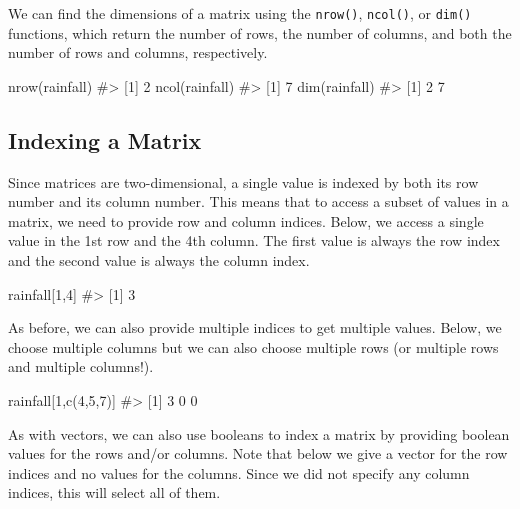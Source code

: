 \documentclass[
  letterpaper,
]{krantz}
\makeatletter
\newenvironment{Shaded}{\begin{snugshade}}{\end{snugshade}}
\newcommand{\CommentTok}[1]{\textcolor[rgb]{0.37,0.37,0.37}{#1}}
\newcommand{\DecValTok}[1]{\textcolor[rgb]{0.68,0.00,0.00}{#1}}
\newcommand{\FunctionTok}[1]{\textcolor[rgb]{0.28,0.35,0.67}{#1}}
\newcommand{\NormalTok}[1]{\textcolor[rgb]{0.00,0.23,0.31}{#1}}
\newenvironment{kframe}{%
\medskip{}
\setlength{\fboxsep}{.8em}
 \def\at@end@of@kframe{}%
 \ifinner\ifhmode%
  \def\at@end@of@kframe{\end{minipage}}%
  \begin{minipage}{\columnwidth}%
 \fi\fi%
 \def\FrameCommand##1{\hskip\@totalleftmargin \hskip-\fboxsep
 \colorbox{shadecolor}{##1}\hskip-\fboxsep
     \hskip-\linewidth \hskip-\@totalleftmargin \hskip\columnwidth}%
 \MakeFramed {\advance\hsize-\width
   \@totalleftmargin\z@ \linewidth\hsize
   \@setminipage}}%
 {\par\unskip\endMakeFramed%
 \at@end@of@kframe}
\renewenvironment{Shaded}{\begin{kframe}}{\end{kframe}}
\makeatother
\begin{document}
We can find the dimensions of a matrix using the \texttt{nrow()},
\texttt{ncol()}, or \texttt{dim()} functions, which return the number of
rows, the number of columns, and both the number of rows and columns,
respectively.

\begin{Shaded}
\begin{Highlighting}[]
\FunctionTok{nrow}\NormalTok{(rainfall)}
\CommentTok{\#\textgreater{} [1] 2}
\FunctionTok{ncol}\NormalTok{(rainfall)}
\CommentTok{\#\textgreater{} [1] 7}
\FunctionTok{dim}\NormalTok{(rainfall)}
\CommentTok{\#\textgreater{} [1] 2 7}
\end{Highlighting}
\end{Shaded}

\subsection{Indexing a Matrix}\label{indexing-a-matrix}

Since matrices are two-dimensional, a single value is indexed by both
its row number and its column number. This means that to access a subset
of values in a matrix, we need to provide row and column indices. Below,
we access a single value in the 1st row and the 4th column. The first
value is always the row index and the second value is always the column
index.

\begin{Shaded}
\begin{Highlighting}[]
\NormalTok{rainfall[}\DecValTok{1}\NormalTok{,}\DecValTok{4}\NormalTok{]}
\CommentTok{\#\textgreater{} [1] 3}
\end{Highlighting}
\end{Shaded}

As before, we can also provide multiple indices to get multiple values.
Below, we choose multiple columns but we can also choose multiple rows
(or multiple rows and multiple columns!).

\begin{Shaded}
\begin{Highlighting}[]
\NormalTok{rainfall[}\DecValTok{1}\NormalTok{,}\FunctionTok{c}\NormalTok{(}\DecValTok{4}\NormalTok{,}\DecValTok{5}\NormalTok{,}\DecValTok{7}\NormalTok{)]}
\CommentTok{\#\textgreater{} [1] 3 0 0}
\end{Highlighting}
\end{Shaded}

As with vectors, we can also use booleans to index a matrix by providing
boolean values for the rows and/or columns. Note that below we give a
vector for the row indices and no values for the columns. Since we did
not specify any column indices, this will select all of them.
\end{document}
